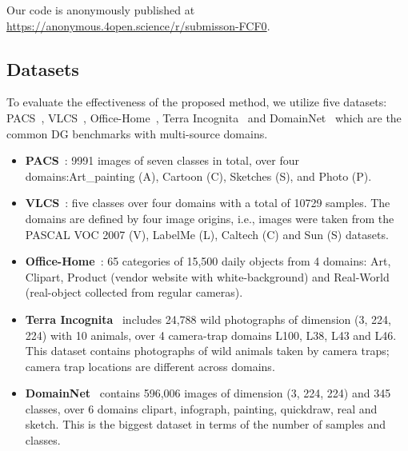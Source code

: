 Our code is anonymously published at \url{https://anonymous.4open.science/r/submisson-FCF0}.


\subsection{Datasets}
To evaluate the effectiveness of the proposed method, we utilize five
datasets: PACS~\citep{li2017deeper}, VLCS~\citep{torralba2011unbiased},
 Office-Home~\citep{venkateswara2017deep}, Terra Incognita~\citep{beery2018recognition} and DomainNet~\citep{peng2019moment} which are the common DG benchmarks with multi-source domains.
\begin{itemize}
    \item \textbf{PACS}~\citep{li2017deeper}: 9991 images of seven classes in total, over four domains:Art\_painting (A), Cartoon (C), Sketches (S), and Photo (P). 
    
    \item \textbf{VLCS}~\citep{torralba2011unbiased}: five classes over four domains with a total of 10729 samples. The domains are defined by four image origins, i.e., images were taken from the PASCAL VOC 2007 (V), LabelMe (L), Caltech (C) and Sun (S) datasets. 


    \item \textbf{Office-Home}~\citep{venkateswara2017deep}: 65 categories of 15,500 daily objects from 4 domains: Art, Clipart, Product (vendor website with white-background) and Real-World (real-object collected from regular cameras).
    \item \textbf{Terra Incognita}~\citep{beery2018recognition} includes 24,788 wild photographs of dimension (3, 224, 224) with 10
animals, over 4 camera-trap domains L100, L38, L43 and L46. This dataset contains photographs of wild animals taken by camera traps; camera trap locations are different across 
domains. 
    \item  \textbf{DomainNet}~\citep{peng2019moment} contains 596,006 images of dimension (3, 224, 224) and 345 classes, over
6 domains clipart, infograph, painting, quickdraw, real and sketch. This is the biggest
dataset in terms of the number of samples and classes.
\end{itemize}




